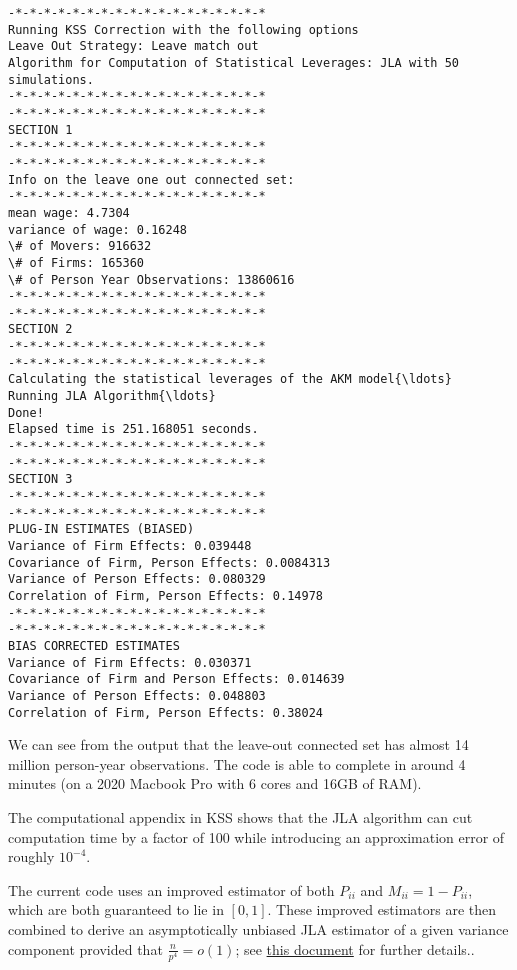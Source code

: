 \documentclass[11pt]{article}
\begin{document}
    \begin{Verbatim}[commandchars=\\\{\}]
-*-*-*-*-*-*-*-*-*-*-*-*-*-*-*-*-*-*
Running KSS Correction with the following options
Leave Out Strategy: Leave match out
Algorithm for Computation of Statistical Leverages: JLA with 50 simulations.
-*-*-*-*-*-*-*-*-*-*-*-*-*-*-*-*-*-*
-*-*-*-*-*-*-*-*-*-*-*-*-*-*-*-*-*-*
SECTION 1
-*-*-*-*-*-*-*-*-*-*-*-*-*-*-*-*-*-*
-*-*-*-*-*-*-*-*-*-*-*-*-*-*-*-*-*-*
Info on the leave one out connected set:
-*-*-*-*-*-*-*-*-*-*-*-*-*-*-*-*-*-*
mean wage: 4.7304
variance of wage: 0.16248
\# of Movers: 916632
\# of Firms: 165360
\# of Person Year Observations: 13860616
-*-*-*-*-*-*-*-*-*-*-*-*-*-*-*-*-*-*
-*-*-*-*-*-*-*-*-*-*-*-*-*-*-*-*-*-*
SECTION 2
-*-*-*-*-*-*-*-*-*-*-*-*-*-*-*-*-*-*
-*-*-*-*-*-*-*-*-*-*-*-*-*-*-*-*-*-*
Calculating the statistical leverages of the AKM model{\ldots}
Running JLA Algorithm{\ldots}
Done!
Elapsed time is 251.168051 seconds.
-*-*-*-*-*-*-*-*-*-*-*-*-*-*-*-*-*-*
-*-*-*-*-*-*-*-*-*-*-*-*-*-*-*-*-*-*
SECTION 3
-*-*-*-*-*-*-*-*-*-*-*-*-*-*-*-*-*-*
-*-*-*-*-*-*-*-*-*-*-*-*-*-*-*-*-*-*
PLUG-IN ESTIMATES (BIASED)
Variance of Firm Effects: 0.039448
Covariance of Firm, Person Effects: 0.0084313
Variance of Person Effects: 0.080329
Correlation of Firm, Person Effects: 0.14978
-*-*-*-*-*-*-*-*-*-*-*-*-*-*-*-*-*-*
-*-*-*-*-*-*-*-*-*-*-*-*-*-*-*-*-*-*
BIAS CORRECTED ESTIMATES
Variance of Firm Effects: 0.030371
Covariance of Firm and Person Effects: 0.014639
Variance of Person Effects: 0.048803
Correlation of Firm, Person Effects: 0.38024
    \end{Verbatim}

    We can see from the output that the leave-out connected set has almost
14 million person-year observations. The code is able to complete in
around 4 minutes (on a 2020 Macbook Pro with 6 cores and 16GB of RAM).

The computational appendix in KSS shows that the JLA algorithm can cut
computation time by a factor of 100 while introducing an approximation
error of roughly \(10^{-4}\).

The current code uses an improved estimator of both \(P_{ii}\) and
\(M_{ii}=1-P_{ii}\), which are both guaranteed to lie in \([0,1]\). These
improved estimators are then combined to derive an asymptotically unbiased JLA
estimator of a given variance component provided that
\(\frac{n}{p^{4}}=o(1)\); see \href{https://www.dropbox.com/s/i28yvzae2tnp2tl/improved_JLA.pdf?dl=1}{this document} for further details..
\end{document}
